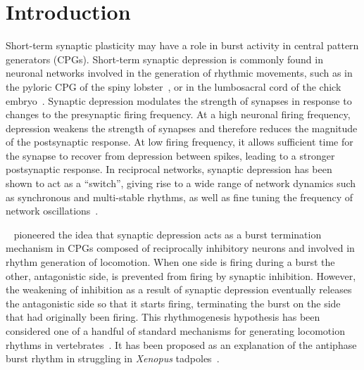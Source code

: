 \documentclass[utf8]{frontiersFPHY} %
\begin{document}
\section{Introduction}
Short-term synaptic plasticity may have a role in burst activity in central pattern
generators (CPGs).
Short-term synaptic depression is commonly found in neuronal networks involved in the generation of rhythmic movements, such as in the pyloric CPG of the spiny lobster~\citep{manor1997, rabbah2007}, or in the lumbosacral cord of the chick embryo~\citep{donovan1998}.
Synaptic depression modulates the strength of synapses in response to changes to the presynaptic firing frequency.
At a high neuronal firing frequency, depression weakens the strength of synapses and therefore reduces the magnitude of the postsynaptic response.
At low firing frequency, it allows sufficient time for the synapse to recover from depression between spikes, leading to a stronger postsynaptic response.
In reciprocal networks, synaptic depression has been shown to act as a ``switch'', giving rise to a wide range of network dynamics such as synchronous and multi-stable rhythms, as well as fine tuning the frequency of network oscillations~\citep{nadim2000, nadim1999, bose2011}.

~\citet{brown1911} pioneered the idea that synaptic depression acts as a burst termination
mechanism in CPGs composed of reciprocally inhibitory neurons and involved in rhythm generation of locomotion.
When one side is firing during a burst the other, antagonistic side, is prevented from
firing by synaptic inhibition.
However, the weakening of inhibition as a result of synaptic depression eventually releases the antagonistic side so that it starts firing, terminating the burst on the side that had originally been firing.
This rhythmogenesis hypothesis has been considered one of a handful of standard mechanisms for generating locomotion rhythms in vertebrates~\citep{reiss1962,perkel1974,friesen1994}.
It has been proposed as an explanation of the antiphase burst rhythm in struggling in \textit{Xenopus} tadpoles~\citep{li2007}.
\end{document}
